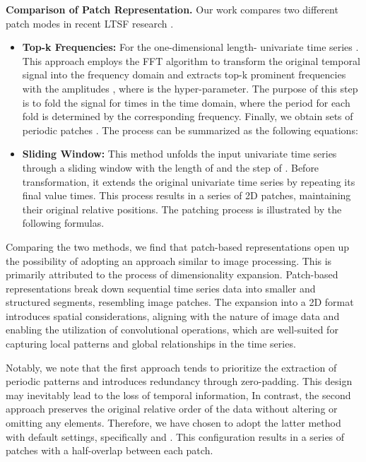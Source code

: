 \documentclass{article} \usepackage{iclr2024_conference,times}
\begin{document}
\noindent \textbf{Comparison of Patch Representation.} Our work compares two different patch modes in recent LTSF research \citep{timesnet, patchtst}. 

\noindent\begin{itemize}
\item{\textbf{Top-k Frequencies:}} For the one-dimensional length- univariate time series . This approach employs the FFT algorithm to transform the original temporal signal into the frequency domain and extracts top-k prominent frequencies  with the amplitudes , where  is the hyper-parameter. The purpose of this step is to fold the signal for  times in the time domain, where the period for each fold is determined by the corresponding frequency. Finally, we obtain  sets of periodic patches . The process can be summarized as the following equations: 




\item{\textbf{Sliding Window:}} This method unfolds the input univariate time series  through a sliding window with the length of  and the step of . Before transformation, it extends the original univariate time series  by repeating its final value  times. This process results in a series of 2D patches, maintaining their original relative positions. The patching process is illustrated by the following formulas.




\end{itemize}



Comparing the two methods, we find that patch-based representations open up the possibility of adopting an approach similar to image processing. This is primarily attributed to the process of dimensionality expansion. Patch-based representations break down sequential time series data into smaller and structured segments, resembling image patches. The expansion into a 2D format introduces spatial considerations, aligning with the nature of image data and enabling the utilization of convolutional operations, which are well-suited for capturing local patterns and global relationships in the time series. 

Notably, we note that the first approach tends to prioritize the extraction of periodic patterns and introduces redundancy through zero-padding. This design may inevitably lead to the loss of temporal information, In contrast, the second approach preserves the original relative order of the data without altering or omitting any elements. Therefore, we have chosen to adopt the latter method with default settings, specifically  and . This configuration results in a series of patches with a half-overlap between each patch.
 
\end{document}
